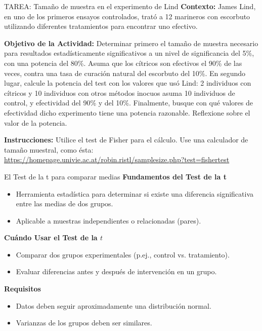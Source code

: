 ﻿\documentclass{beamer}
\begin{document}
\begin{frame}{TAREA: Tamaño de muestra en el experimento de Lind}
    \textbf{Contexto:}
    James Lind, en uno de los primeros ensayos controlados, trató a 12 marineros con escorbuto utilizando diferentes tratamientos para encontrar uno efectivo.

    \textbf{Objetivo de la Actividad:}
    Determinar primero el tamaño de muestra necesario para resultados estadísticamente significativos a un nivel de significancia del 5\%, con una potencia del 80\%. Asuma que los cítricos son efectivos el 90\% de las veces, contra una tasa de curación natural del escorbuto del 10\%. En segundo lugar, calcule la potencia del test con los valores que usó Lind: 2 individuos con cítricos y 10 individuos con otros métodos inocuos asuma 10 individuos de control, y efectividad del 90\% y del 10\%. Finalmente, busque con qué valores de efectividad dicho experimento tiene una potencia razonable. Reflexione sobre el valor de la potencia. 

    \textbf{Instrucciones:}
    Utilice el test de Fisher para el cálculo. Use una calculador de tamaño muestral, como ésta:
    \url{https://homepage.univie.ac.at/robin.ristl/samplesize.php?test=fishertest}
\end{frame}

\begin{frame}{El Test de la t para comparar medias}
    \textbf{Fundamentos del Test de la t}
    \begin{itemize}
        \item Herramienta estadística para determinar si existe una diferencia significativa entre las medias de dos grupos.
        \item Aplicable a muestras independientes o relacionadas (pares).
    \end{itemize}

    \textbf{Cuándo Usar el Test de la \(t\)}
    \begin{itemize}
        \item Comparar dos grupos experimentales (p.ej., control vs. tratamiento).
        \item Evaluar diferencias antes y después de intervención en un grupo.
    \end{itemize}

    \textbf{Requisitos}
    \begin{itemize}
        \item Datos deben seguir aproximadamente una distribución normal.
        \item Varianzas de los grupos deben ser similares.
    \end{itemize}
\end{frame}
\end{document}
